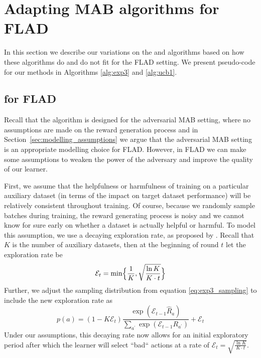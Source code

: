 \section{Adapting MAB algorithms for FLAD}
In this section we describe our variations on the \ex{} and \ucb{} algorithms based on how these algorithms do and do not fit for the FLAD setting. We present pseudo-code for our methods in Algorithms \ref{alg:exp3} and \ref{alg:ucb1}.

\subsection{\ex{} for FLAD}

Recall that the \ex{} algorithm is designed for the adversarial MAB setting, where no assumptions are made on the reward generation process and in Section~\ref{sec:modelling_assumptions} we argue that the adversarial MAB setting is an appropriate modelling choice for FLAD.
However, in FLAD we can make some assumptions to weaken the power of the adversary and improve the quality of our learner.

First, we assume that the helpfulness or harmfulness of training on a particular auxiliary dataset (in terms of the impact on target dataset performance) will be relatively consistent throughout training.
Of course, because we randomly sample batches during training, the reward generating process is noisy and we cannot know for sure early on whether a dataset is actually helpful or harmful.
To model this assumption, we use a decaying exploration rate, as proposed by \citet{pmlr-v24-seldin12a}.
Recall that $K$ is the number of auxiliary datasets, then at the beginning of round $t$ let the exploration rate be
\begin{equation}
\label{eq:exploration_rate}
    \mathcal{E}_{t} = \min \Bigl\{\frac{1}{K}, \sqrt{\frac{\ln K}{K\cdot t}} \Bigr\}
\end{equation}
Further, we adjust the sampling distribution from equation \ref{eq:exp3_sampling} to include the new exploration rate as
\begin{equation}
\label{eq:our_exp3_sampling}
    p(a) = (1-K\mathcal{E}_{t})\frac{\exp(\mathcal{E}_{t-1}\hat{R}_{a})}{\sum_{a^{\prime}} \exp(\mathcal{E}_{t-1}R_{a^{\prime}})}+\mathcal{E}_{t}
\end{equation}
Under our assumptions, this decaying rate now allows for an initial exploratory period after which the learner will select ``bad`` actions at a rate of $\mathcal{E}_{t}=\sqrt{\frac{\ln K}{K\cdot t}}$.

